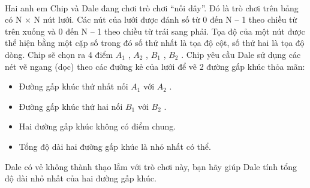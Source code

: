  

Hai anh em Chip và Dale đang chơi trò chơi “nối dây”. Đó là trò chơi trên bảng có N × N nút lưới. Các nút của lưới được đánh số từ 0 đến N – 1 theo chiều từ trên xuống và 0 đến N – 1 theo chiều từ trái sang phải. Tọa độ của một nút được thể hiện bằng một cặp số trong đó số thứ nhất là tọa độ cột, số thứ hai là tọa độ dòng. Chip sẽ chọn ra 4 điểm $A_{1}$ , $A_{2}$ , $B_{1}$ , $B_{2}$ . Chip yêu cầu Dale sử dụng các nét vẽ ngang (dọc) theo các đường kẻ của lưới để vẽ 2 đường gấp khúc thỏa mãn:
\begin{itemize}
	\item Đường gấp khúc thứ nhất nối $A_{1}$ với $A_{2}$ .
	\item Đường gấp khúc thứ hai nối $B_{1}$ với $B_{2}$ .
	\item Hai đường gấp khúc không có điểm chung.
	\item Tổng độ dài hai đường gấp khúc là nhỏ nhất có thể.
\end{itemize}

Dale có vẻ không thành thạo lắm với trò chơi này, bạn hãy giúp Dale tính tổng độ dài nhỏ nhất của hai đường gấp khúc.